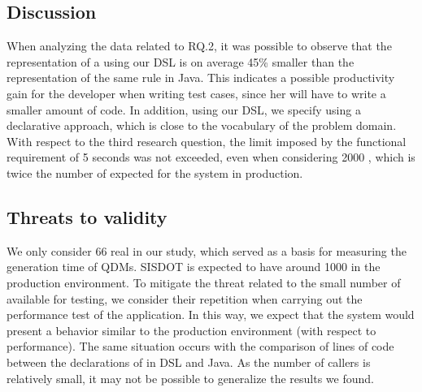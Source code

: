 \subsection{Discussion}

When analyzing the data related to RQ.2, it was possible to observe that the representation 
of a \shc using our DSL is on average 45\% smaller than the representation of the same rule in Java. 
This indicates a possible productivity gain for the developer when writing test cases, 
since her will have to write a smaller amount of code. In addition, using our DSL, we 
specify \callers using a declarative approach, which is close to the vocabulary of 
the problem domain. 
With respect to the third research question, the limit imposed by the functional requirement of 5 seconds was not exceeded,  
even when considering 2000 \callers, which is twice the number of \callers expected for the system 
in production.

\subsection{Threats to validity}


We only consider 66 real \callers in our study, which served as a basis for measuring the generation time 
of QDMs. SISDOT is expected to have around 1000 \callers in the production environment. To mitigate the threat 
related to the small number of available \callers for testing, we consider their repetition when carrying out the 
performance test of the application. In this way, we expect that the system would present a behavior similar 
to the production environment (with respect to performance). The same situation occurs with the comparison 
of lines of code between the declarations of \callers in DSL and Java. As the number of callers is relatively small, 
it may not be possible to generalize the results we found.

